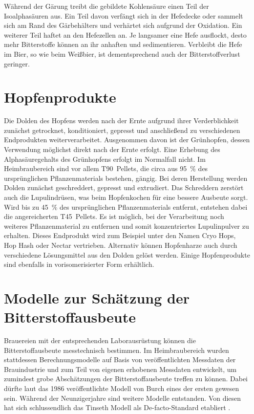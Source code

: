 \documentclass[a4paper,parskip=half]{scrartcl}
\begin{document}
Während der Gärung treibt die gebildete Kohlensäure einen Teil der Isoalphasäuren aus. Ein Teil davon verfängt sich in der Hefedecke oder sammelt sich am Rand des Gärbehälters und verhärtet sich aufgrund der Oxidation. Ein weiterer Teil haftet an den Hefezellen an. Je langsamer eine Hefe ausflockt, desto mehr Bitterstoffe können an ihr anhaften und sedimentieren. Verbleibt die Hefe im Bier, so wie beim Weißbier, ist dementsprechend auch der Bitterstoffverlust geringer. \parencite[126]{Garetz1994} 

\section*{Hopfenprodukte}

Die Dolden des Hopfens werden nach der Ernte aufgrund ihrer Verderblichkeit zunächst getrocknet, konditioniert, gepresst und anschließend zu verschiedenen Endprodukten weiterverarbeitet. Ausgenommen davon ist der Grünhopfen, dessen Verwendung möglichst direkt nach der Ernte erfolgt. Eine Erhebung des Alphasäuregehalts des Grünhopfens erfolgt im Normalfall nicht. Im Heimbraubereich sind vor allem T90~Pellets, die circa aus 95~\% des ursprünglichen Pflanzenmaterials bestehen, gängig. Bei deren Herstellung werden Dolden zunächst geschreddert, gepresst und extrudiert. Das Schreddern zerstört auch die Lupulindrüsen, was beim Hopfenkochen für eine bessere Ausbeute sorgt. Wird bis zu 45~\% des ursprünglichen Pflanzenmaterials entfernt, entstehen dabei die angereicherten T45~Pellets. Es ist möglich, bei der Verarbeitung noch weiteres Pflanzenmaterial zu entfernen und somit konzentriertes Lupulinpulver zu erhalten. Dieses Endprodukt wird zum Beispiel unter den Namen Cryo Hops, Hop Hash oder Nectar vertrieben. Alternativ können Hopfenharze auch durch verschiedene Lösungsmittel aus den Dolden gelöst werden. Einige Hopfenprodukte sind ebenfalls in vorisomerisierter Form erhältlich. \parencites[166-172]{Nottebohm2020}[80-90]{Garetz1994}

\section*{Modelle zur Schätzung der Bitterstoffausbeute}

Brauereien mit der entsprechenden Laborausrüstung können die Bitterstoffausbeute messtechnisch bestimmen. Im Heimbraubereich wurden stattdessen Berechnungsmodelle auf Basis von veröffentlichten Messdaten der Brauindustrie und zum Teil von eigenen erhobenen Messdaten entwickelt, um zumindest grobe Abschätzungen der Bitterstoffausbeute treffen zu können. Dabei dürfte laut \textcite{Bonham2001} das 1986 veröffentlichte Modell von Burch eines der ersten gewesen sein. Während der Neunzigerjahre sind weitere Modelle entstanden. Von diesen hat sich schlussendlich das Tinseth Modell als De-facto-Standard etabliert \parencite[185]{Hieronymus2012}.
\end{document}
